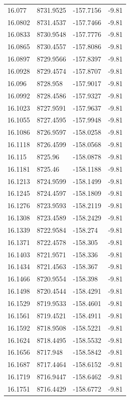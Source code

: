 \begin{table}[H]
\begin{tabular}{llll}
16.077 & 8731.9525 & -157.7156 & -9.81 \\
16.0802 & 8731.4537 & -157.7466 & -9.81 \\
16.0833 & 8730.9548 & -157.7776 & -9.81 \\
16.0865 & 8730.4557 & -157.8086 & -9.81 \\
16.0897 & 8729.9566 & -157.8397 & -9.81 \\
16.0928 & 8729.4574 & -157.8707 & -9.81 \\
16.096 & 8728.958 & -157.9017 & -9.81 \\
16.0992 & 8728.4586 & -157.9327 & -9.81 \\
16.1023 & 8727.9591 & -157.9637 & -9.81 \\
16.1055 & 8727.4595 & -157.9948 & -9.81 \\
16.1086 & 8726.9597 & -158.0258 & -9.81 \\
16.1118 & 8726.4599 & -158.0568 & -9.81 \\
16.115 & 8725.96 & -158.0878 & -9.81 \\
16.1181 & 8725.46 & -158.1188 & -9.81 \\
16.1213 & 8724.9599 & -158.1499 & -9.81 \\
16.1245 & 8724.4597 & -158.1809 & -9.81 \\
16.1276 & 8723.9593 & -158.2119 & -9.81 \\
16.1308 & 8723.4589 & -158.2429 & -9.81 \\
16.1339 & 8722.9584 & -158.274 & -9.81 \\
16.1371 & 8722.4578 & -158.305 & -9.81 \\
16.1403 & 8721.9571 & -158.336 & -9.81 \\
16.1434 & 8721.4563 & -158.367 & -9.81 \\
16.1466 & 8720.9554 & -158.398 & -9.81 \\
16.1498 & 8720.4544 & -158.4291 & -9.81 \\
16.1529 & 8719.9533 & -158.4601 & -9.81 \\
16.1561 & 8719.4521 & -158.4911 & -9.81 \\
16.1592 & 8718.9508 & -158.5221 & -9.81 \\
16.1624 & 8718.4495 & -158.5532 & -9.81 \\
16.1656 & 8717.948 & -158.5842 & -9.81 \\
16.1687 & 8717.4464 & -158.6152 & -9.81 \\
16.1719 & 8716.9447 & -158.6462 & -9.81 \\
16.1751 & 8716.4429 & -158.6772 & -9.81 \\

\end{tabular}
\end{table}

